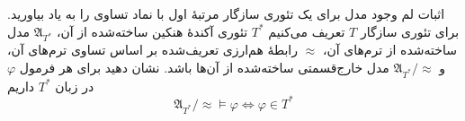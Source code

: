 اثبات لم وجود مدل برای یک تئوری سازگار مرتبهٔ اول با نماد تساوی را به یاد بیاورید. برای تئوری سازگار $T$ تعریف می‌کنیم $T^*$ تئوری آکندهٔ هنکین ساخته‌شده از آن، $\mathfrak{A}_{T^*}$ مدل ساخته‌شده از ترم‌های آن، $\approx$ رابطهٔ هم‌ارزی تعریف‌شده بر اساس تساوی ترم‌های آن، و ${\mathfrak{A}_{T^*}}/{\approx}$ مدل خارج‌قسمتی ساخته‌شده از آن‌ها باشد. نشان دهید برای هر فرمول $\varphi$ در زبان $T^*$ داریم
\[ {\mathfrak{A}_{T^*}}/{\approx} \models \varphi \iff \varphi \in T^* \]
